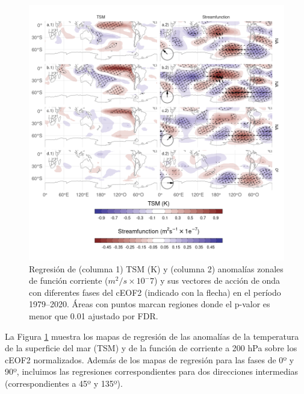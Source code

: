 \documentclass[12pt,oneside,a4paper]{reedthesis}
\begin{document}
\begin{figure}

{\centering \includegraphics{figures/20-ceofs/sst-psi-2-1} 

}

\caption{Regresión de (columna 1) TSM (K) y (columna 2) anomalías zonales de función corriente (\(m^2/s\times10^-7\)) y sus vectores de acción de onda con diferentes fases del cEOF2 (indicado con la flecha) en el período 1979--2020. Áreas con puntos marcan regiones donde el p-valor es menor que 0.01 ajustado por FDR.}\label{fig:sst-psi-2}
\end{figure}

La Figura \ref{fig:sst-psi-2} muestra los mapas de regresión de las anomalías de la temperatura de la superficie del mar (TSM) y de la función de corriente a 200 hPa sobre los cEOF2 normalizados.
Además de los mapas de regresión para las fases de 0º y 90º, incluimos las regresiones correspondientes para dos direcciones intermedias (correspondientes a 45º y 135º).
\end{document}
